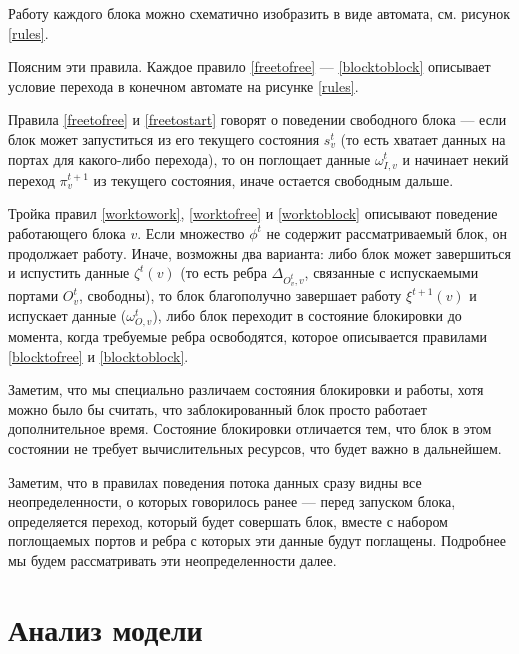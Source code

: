 \documentclass[10pt,a4paper]{article}
\begin{document}
Работу каждого блока можно схематично изобразить в виде автомата, см. рисунок \ref{rules}.

Поясним эти правила. Каждое правило \eqref{freetofree} --- \eqref{blocktoblock} описывает условие перехода в конечном автомате на рисунке \ref{rules}.

Правила \eqref{freetofree} и \eqref{freetostart} говорят о поведении свободного блока --- если блок может запуститься из его текущего состояния $s^t_v$
(то есть хватает данных на портах для какого-либо перехода), то он поглощает данные $\omega^t_{I, v}$ и
начинает некий переход $\pi^{t+1}_v$ из текущего состояния, иначе остается свободным дальше.

Тройка правил \eqref{worktowork}, \eqref{worktofree} и \eqref{worktoblock} описывают поведение работающего блока $v$. Если множество $\phi^t$ не содержит рассматриваемый блок,
он продолжает работу. Иначе, возможны два варианта: либо блок может завершиться и испустить данные $\zeta^t(v)$ (то есть ребра $\Delta_{O^t_v, v}$, связанные с
испускаемыми портами $O^t_v$, свободны), то блок благополучно завершает работу $\xi^{t + 1}(v)$ и испускает данные ($\omega^t_{O, v}$),
либо блок переходит в состояние блокировки до момента, когда требуемые ребра освободятся, которое описывается правилами \eqref{blocktofree} и \eqref{blocktoblock}.

Заметим, что мы специально различаем состояния блокировки и работы, хотя можно было бы считать, что заблокированный блок просто работает дополнительное время.
Состояние блокировки отличается тем, что блок в этом состоянии не требует вычислительных ресурсов, что будет важно в дальнейшем.

Заметим, что в правилах поведения потока данных сразу видны все неопределенности, о которых говорилось ранее --- перед запуском блока, определяется переход,
который будет совершать блок, вместе с набором поглощаемых портов и ребра с которых эти данные будут поглащены. Подробнее мы будем рассматривать эти неопределенности далее.

\section{Анализ модели}
\end{document}
